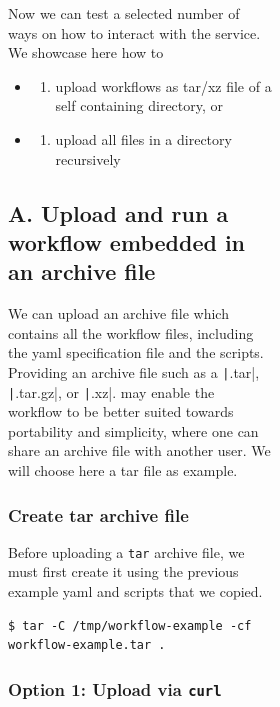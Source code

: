 \begin{figure}[htb]
\begin{figure}[htb]
\begin{figure}[htb]
Now we can test a selected number of ways on how to interact with the
service. We showcase here how to

\begin{itemize}
\item
  \begin{enumerate}
  \def\labelenumi{\Alph{enumi}.}
  \item
    upload workflows as tar/xz file of a self containing directory, or
  \end{enumerate}
\item
  \begin{enumerate}
  \def\labelenumi{\Alph{enumi}.}
  \setcounter{enumi}{1}
  \item
    upload all files in a directory recursively
  \end{enumerate}
\end{itemize}

\subsection{A. Upload and run a workflow embedded in an archive
file}\label{a.-upload-and-run-a-workflow-embedded-in-an-archive-file}

We can upload an archive file which contains all the workflow files,
including the yaml specification file and the scripts. Providing an
archive file such as a \texttt|.tar|, \texttt|.tar.gz|, or \texttt|.xz|.
may enable the workflow to be better suited towards portability and
simplicity, where one can share an archive file with another user. We
will choose here a tar file as example.

\subsubsection{Create tar archive file}\label{create-tar-archive-file}

Before uploading a \texttt{tar} archive file, we must first create it
using the previous example yaml and scripts that we copied.

\smallskip
\begin{verbatim}
$ tar -C /tmp/workflow-example -cf workflow-example.tar .
\end{verbatim}
\smallskip

\subsubsection{\texorpdfstring{Option 1: Upload via
\texttt{curl}}{Option 1: Upload via curl}}\label{option-1-upload-via-curl}


\end{figure}
\end{figure}
\end{figure}
